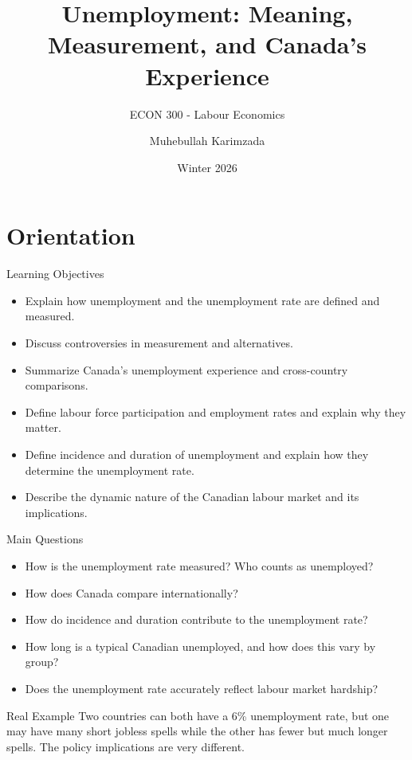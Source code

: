 \documentclass[aspectratio=169]{beamer}
\title{\textbf{Unemployment: Meaning, Measurement, and Canada's Experience}}
\subtitle{{\large ECON 300 - Labour Economics}}
\author{Muhebullah Karimzada}
\date{Winter 2026}
\begin{document}
\begin{frame}[plain]
  \titlepage
\end{frame}

\section{Orientation}

\begin{frame}{Learning Objectives}
\transfade
\begin{itemize}[<+->]
  \item Explain how unemployment and the unemployment rate are defined and measured.
  \item Discuss controversies in measurement and alternatives.
  \item Summarize Canada's unemployment experience and cross-country comparisons.
  \item Define labour force participation and employment rates and explain why they matter.
  \item Define incidence and duration of unemployment and explain how they determine the unemployment rate.
  \item Describe the dynamic nature of the Canadian labour market and its implications.
\end{itemize}


\end{frame}

\begin{frame}{Main Questions}
\transfade
\begin{itemize}[<+->]
  \item How is the unemployment rate measured? Who counts as unemployed?
  \item How does Canada compare internationally?
  \item How do incidence and duration contribute to the unemployment rate?
  \item How long is a typical Canadian unemployed, and how does this vary by group?
  \item Does the unemployment rate accurately reflect labour market hardship?
\end{itemize}

\begin{exampleblock}{Real Example}
Two countries can both have a 6\% unemployment rate, but one may have many short jobless spells while the other has fewer but much longer spells. The policy implications are very different.
\end{exampleblock}
\end{frame}
\end{document}
